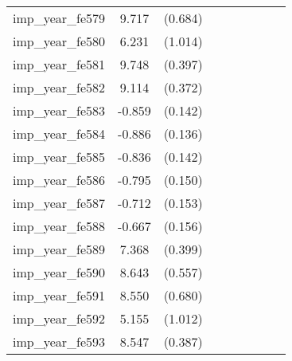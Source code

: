 {\begin{tabular}{l*{4}{cc}}
imp\_year\_fe579&    9.717\sym{***}&  (0.684)&                  &         &                  &         &                  &         \\
imp\_year\_fe580&    6.231\sym{***}&  (1.014)&                  &         &                  &         &                  &         \\
imp\_year\_fe581&    9.748\sym{***}&  (0.397)&                  &         &                  &         &                  &         \\
imp\_year\_fe582&    9.114\sym{***}&  (0.372)&                  &         &                  &         &                  &         \\
imp\_year\_fe583&   -0.859\sym{***}&  (0.142)&                  &         &                  &         &                  &         \\
imp\_year\_fe584&   -0.886\sym{***}&  (0.136)&                  &         &                  &         &                  &         \\
imp\_year\_fe585&   -0.836\sym{***}&  (0.142)&                  &         &                  &         &                  &         \\
imp\_year\_fe586&   -0.795\sym{***}&  (0.150)&                  &         &                  &         &                  &         \\
imp\_year\_fe587&   -0.712\sym{***}&  (0.153)&                  &         &                  &         &                  &         \\
imp\_year\_fe588&   -0.667\sym{***}&  (0.156)&                  &         &                  &         &                  &         \\
imp\_year\_fe589&    7.368\sym{***}&  (0.399)&                  &         &                  &         &                  &         \\
imp\_year\_fe590&    8.643\sym{***}&  (0.557)&                  &         &                  &         &                  &         \\
imp\_year\_fe591&    8.550\sym{***}&  (0.680)&                  &         &                  &         &                  &         \\
imp\_year\_fe592&    5.155\sym{***}&  (1.012)&                  &         &                  &         &                  &         \\
imp\_year\_fe593&    8.547\sym{***}&  (0.387)&                  &         &                  &         &                  &         \\

\end{tabular}}
